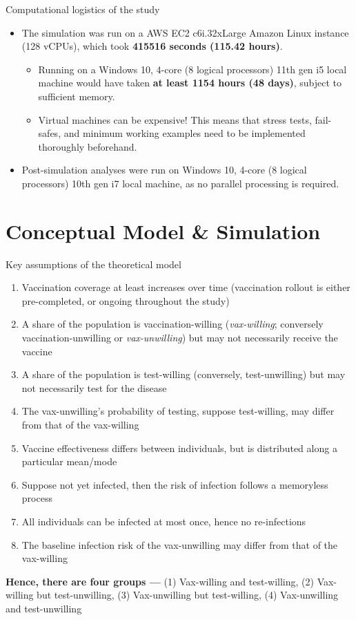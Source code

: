 \documentclass[aspectratio=169]{beamer}
\begin{document}
\begin{frame}{Computational logistics of the study}
	\begin{itemize}
		\item The simulation was run on a AWS EC2 c6i.32xLarge Amazon Linux instance (128 vCPUs), which took \textbf{415516 seconds (115.42 hours)}. 
		\begin{itemize}
			\item Running on a Windows 10, 4-core (8 logical processors) 11th gen i5 local machine would have taken\textbf{ at least 1154 hours (48 days)}, subject to sufficient memory.
			\item Virtual machines can be expensive! This means that stress tests, fail-safes, and minimum working examples need to be implemented thoroughly beforehand. 
		\end{itemize}
		\item Post-simulation analyses were run on Windows 10, 4-core (8 logical processors) 10th gen i7 local machine, as no parallel processing is required.
	\end{itemize}
\end{frame}

\section{Conceptual Model \& Simulation}
\begin{frame}{Key assumptions of the theoretical model}
	\footnotesize
	\begin{enumerate}
		\item Vaccination coverage at least increases over time (vaccination rollout is either pre-completed, or ongoing throughout the study)
		\item A share of the population is vaccination-willing (\textit{vax-willing}; conversely vaccination-unwilling or \textit{vax-unwilling}) but may not necessarily receive the vaccine
		\item A share of the population is test-willing (conversely, test-unwilling) but may not necessarily test for the disease
		\item The vax-unwilling's probability of testing, suppose test-willing, may differ from that of the vax-willing
		\item Vaccine effectiveness differs between individuals, but is distributed along a particular mean/mode
		\item Suppose not yet infected, then the risk of infection follows a memoryless process
		\item All individuals can be infected at most once, hence no re-infections
		\item The baseline infection risk of the vax-unwilling may differ from that of the vax-willing
	\end{enumerate}
\textbf{Hence, there are four groups --- } (1) Vax-willing and test-willing, (2) Vax-willing but test-unwilling, (3) Vax-unwilling but test-willing, (4) Vax-unwilling and test-unwilling
\end{frame}
\end{document}
